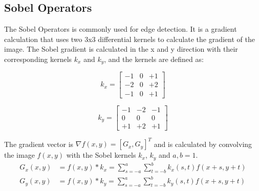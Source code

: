 \subsection{Sobel Operators}
The Sobel Operators \cite{gonzalez_sharpening_2018} is commonly used for edge detection. It is a gradient calculation that uses two 3x3 differential kernels to calculate the gradient of the image. The Sobel gradient is calculated in the x and y direction with their corresponding kernels $k_x$ and $k_y$, and the kernels are defined as:
\begin{center}
    \begin{minipage}{0.44\textwidth}
        \begin{equation}
            k_x = \begin{bmatrix}
                -1 & 0 & +1 \\
                -2 & 0 & +2 \\
                -1 & 0 & +1
            \end{bmatrix} 
        \end{equation}
    \end{minipage}
    \hfill
    \begin{minipage}{0.44\textwidth}
        \begin{equation}
            k_y = \begin{bmatrix}
                -1 & -2 & -1 \\
                0 & 0 & 0 \\
                +1 & +2 & +1
            \end{bmatrix} 
        \end{equation}
         
    \end{minipage}
    
\end{center}
     The gradient vector is $\nabla f(x,y) = [G_x, G_y]^T$  and is calculated by convolving the image $f(x,y)$ with the Sobel kernels $k_x$, $k_y$ and $a,b = 1$.
     \begin{align}
        G_x(x,y) & = f(x,y) * k_x  = \sum_{s=-a}^{a} \sum_{t=-b}^{b} k_x(s,t) f(x+s,y+t) \\
        G_y(x,y) & = f(x,y) * k_y  = \sum_{s=-a}^{a} \sum_{t=-b}^{b} k_y(s,t) f(x+s,y+t)
    \end{align}
     
